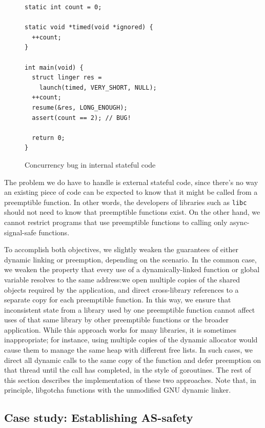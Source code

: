 \begin{figure}
\begin{verbatim}
static int count = 0;

static void *timed(void *ignored) {
  ++count;
}

int main(void) {
  struct linger res =
    launch(timed, VERY_SHORT, NULL);
  ++count;
  resume(&res, LONG_ENOUGH);
  assert(count == 2); // BUG!

  return 0;
}
\end{verbatim}
\caption{Concurrency bug in internal stateful code}
\label{fig:bug}
\end{figure}

The problem we do have to handle is external stateful code, since there's no way an
existing piece of code can be expected to know that it might be called from a
preemptible function.  In other words, the developers of libraries such as
\texttt{libc} should not need to know that preemptible functions exist.  On the other
hand, we cannot restrict programs that use preemptible functions to calling only
async-signal-safe functions.

To accomplish both objectives, we slightly weaken the guarantees of either dynamic
linking or preemption, depending on the scenario.  In the common case, we weaken the
property that every use of a dynamically-linked function or global variable resolves
to the same address:\@ we open multiple copies of the shared objects required by the
application, and direct cross-library references to a separate copy for each
preemptible function.  In this way, we ensure that inconsistent state from a library
used by one preemptible function cannot affect uses of that same library by other
preemptible functions or the broader application.  While this approach works for many
libraries, it is sometimes inappropriate; for instance, using multiple copies of the
dynamic allocator would cause them to manage the same heap with different free lists.
In such cases, we direct all dynamic calls to the same copy of the function and defer
preemption on that thread until the call has completed, in the style of goroutines.
The rest of this section describes the implementation of these two approaches.  Note
that, in principle, libgotcha functions with the unmodified GNU dynamic linker.

\subsection{Case study: Establishing AS-safety}
\label{sec:statefulness}

